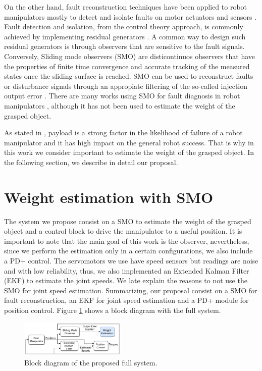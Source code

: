 \documentclass[conference,letterpaper]{ieeeconf}
\begin{document}
On the other hand, fault reconstruction techniques have been applied to robot manipulators mostly to detect and isolate faults on motor actuators and sensors \cite{cordoneanu2018review, zhang2020review}. Fault detection and isolation, from the control theory approach, is commonly achieved by implementing residual generators \cite{abid2020review}. A common way to design such residual generators is through observers that are sensitive to the fault signals. Conversely, Sliding mode observers (SMO) are disticontinuos observers that have the properties of finite time convergence and accurate tracking of the measured states once the sliding surface is reached. SMO can be used to reconstruct faults or disturbance signals through an appropiate filtering of the so-called injection output error \cite{shtessel2014sliding}. There are many works using SMO for fault diagnosis in robot manipulators \cite{capisani2012manipulator}, although it has not been used to estimate the weight of the grasped object.

As stated in \cite{steinbauer2012survey}, payload is a strong factor in the likelihood of failure of a robot manipulator and it has high impact on the general robot success. That is why in this work we consider important to estimate the weight of the grasped object. In the following section, we describe in detail our proposal.

\section{Weight estimation with SMO}
\label{sec:System}

The system we propose consist on a SMO to estimate the weight of the grasped object and a control block to drive the manipulator to a useful position. It is important to note that the main goal of this work is the observer, nevertheless, since we perform the estimation only in a certain configurations, we also include a PD+ control. The servomotors we use have speed sensors but readings are noise and with low reliability, thus, we also implemented an Extended Kalman Filter (EKF) to estimate the joint speeds. We late explain the reasons to not use the SMO for joint speed estimation. Summarizing, our proposal consist on a SMO for fault reconstruction, an EKF for joint speed estimation and a PD+ module for position control. Figure \ref{fig:FullSystemBlocks} shows a block diagram with the full system. 
\begin{figure}
  \centering
  \includegraphics[width=0.45\textwidth]{Figures/full_system.pdf}
  \caption{Block diagram of the proposed full system.}
  \label{fig:FullSystemBlocks}
\end{figure}
\end{document}

